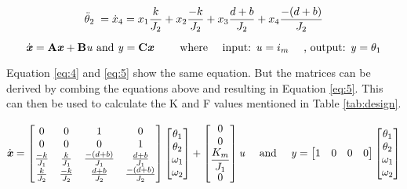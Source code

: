 \begin{equation}
 \ddot{\theta}_2 \; = \dot{x}_4 = x_1 \frac{k}{J_2} +  x_2 \frac{-k}{J_2} + x_3 \frac{d+b}{J_2} + x_4 \frac{-(d+b)}{J_2}
\label{eq:extra2}
\vspace{.2em}
\end{equation}

\begin{equation}
\dot{\text{\textit{\textbf{x}}}}  = {\text{\textbf{A}}}\text{\textit{\textbf{x}}}  +  {\text{\textbf{B}}}\text{\textit{{u}}}  \text{ and } \text{\textit{{y}}}  = {\text{\textbf{C}}}\text{\textit{\textbf{x}}}  \qquad \text{ where } \quad \text{input: \textit{{u}}}=i_m \quad\text{ , output: \textit{{y}}}=\theta_1
\label{eq:4}
\end{equation}

Equation \ref{eq:4} and \ref{eq:5} show the same equation. But the matrices can be derived by combing the equations above and resulting in Equation \ref{eq:5}. This can then be used to calculate the K and F values mentioned in Table \ref{tab:design}.

\begin{equation}
\dot{\text{\textit{\textbf{x}}}}  = \begin{bmatrix}
0 & 0 & 1 & 0 \\
0 & 0 & 0 & 1\\
\frac{-k}{J_1}&\frac{k}{J_1} & \frac{-(d+b)}{J_1}&\frac{d+b}{J_1} \\
 \frac{k}{J_2}& \frac{-k}{J_2} & \frac{d+b}{J_2}& \frac{-(d+b)}{J_2}
\end{bmatrix}
\begin{bmatrix}
\theta_1\\
\theta_2\\
\omega_1\\
\omega_2\\
\end{bmatrix}
+
\begin{bmatrix}
0\\
0\\
\dfrac{K_m}{J_1}\\
0\\
\end{bmatrix}\text{\textit{{u}}}
\quad \text{ and } \quad
\text{\textit{{y}}}=\begin{bmatrix}
1&0&0&0
\end{bmatrix}
\begin{bmatrix}
\theta_1\\
\theta_2\\
\omega_1\\
\omega_2\\
\end{bmatrix}
\label{eq:5}
\end{equation}